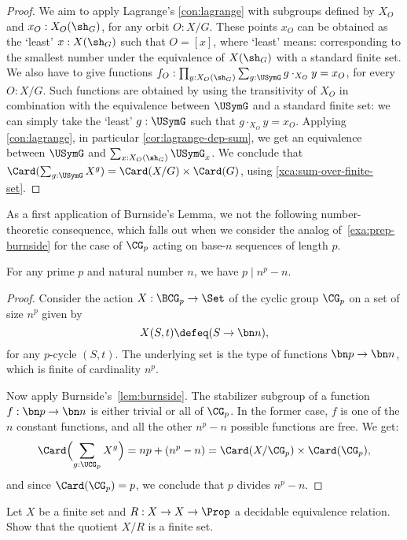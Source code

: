 \begin{proof}
  We aim to apply Lagrange's \cref{con:lagrange} with subgroups 
  defined by $X_O$ and
  $x_O : X_O(\sh_G)$, for any orbit $O:X/G$. These points $x_O$ can
  be obtained as the `least' $x:X(\sh_G)$ such that $O=[x]$,
  where `least' means: corresponding to the smallest number under the
  equivalence of $X(\sh_G)$ with a standard finite set.
  We also have to give functions
  $f_O : \prod_{y:X_O(\sh_G)}\sum_{g:\USymG} g\cdot_{X_O} y = x_O$,
  for every $O:X/G$.
  Such functions are obtained by using the transitivity of $X_O$
  in combination with the equivalence between $\USymG$ and a 
  standard finite set: we can simply take the `least' $g:\USymG$
  such that $g\cdot_{X_O} y = x_O$.
  Applying \cref{con:lagrange}, in particular \cref{cor:lagrange-dep-sum},
  we get an equivalence between $\USymG$ and $\sum_{x : X_O(\sh_G)} \USymG_x$. 
  We conclude that $\Card(\sum_{g:\USymG} X^g) = \Card(X/G) \times \Card(G)$,
  using \cref{xca:sum-over-finite-set}.
\end{proof}

As a first application of Burnside's Lemma, we not the following
number-theoretic consequence, which falls out when we consider
the analog of~\cref{exa:prep-burnside} for the case of $\CG_p$ acting
on base-$n$ sequences of length $p$.

\begin{theorem}
  For any prime $p$ and natural number $n$, we have $p \mid {n^p-n}$.
\end{theorem}
\begin{proof}
  Consider the action $X : \BCG_p \to \Set$ of the cyclic group $\CG_p$ on
  a set of size $n^p$ given by
  \[
    X(S,t) \defeq (S \to \bn n),
  \]
  for any $p$-cycle $(S,t)$. The underlying set is the type of functions
  $\bn p \to \bn n$, which is finite of cardinality $n^p$.

  Now apply Burnside's~\cref{lem:burnside}. The stabilizer subgroup
  of a function $f : \bn p \to \bn n$ is either trivial or all of $\CG_p$.
  In the former case, $f$ is one of the $n$ constant functions,
  and all the other $n^p-n$ possible functions are free.
  We get:
  \[
    \Card\Bigl(\sum_{g:\UCG_p} X^g\Bigr)
    = np + (n^p-n) = \Card(X/\CG_p) \times \Card(\CG_p),
  \]
  and since $\Card(\CG_p)=p$, we conclude that $p$ divides $n^p-n$.
\end{proof}

\begin{xca}\label{xca:dec-quot-finite-set}
Let $X$ be a finite set and $R:X\to X\to\Prop$ a decidable
equivalence relation. Show that the quotient $X/R$ is a finite set.
\end{xca}

